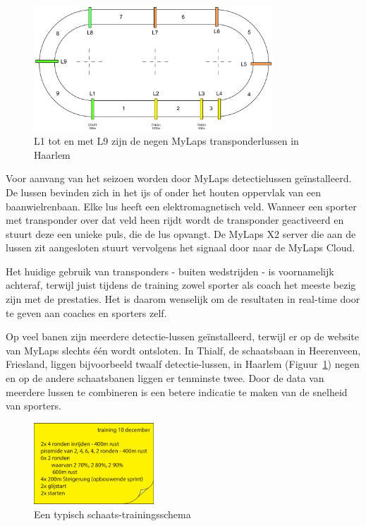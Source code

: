 \begin{figure}
  \begin{center}
    \includegraphics[width=0.8\textwidth]{style/images/BaanoverzichtHaarlem}
  \end{center}
  \caption{L1 tot en met L9 zijn de negen MyLaps transponderlussen in Haarlem}
  \label{fig:track-transponders}
\end{figure}

Voor aanvang van het seizoen worden door MyLaps detectielussen geïnstalleerd. De lussen bevinden zich in het ijs of onder het houten oppervlak van een baanwielrenbaan. Elke lus heeft een elektromagnetisch veld. Wanneer een sporter met transponder over dat veld heen rijdt wordt de transponder geactiveerd en stuurt deze een unieke puls, die de lus opvangt. De MyLaps X2 server die aan de lussen zit aangesloten stuurt vervolgens het signaal door naar de MyLaps Cloud.

Het huidige gebruik van transponders - buiten wedstrijden - is voornamelijk achteraf, terwijl juist tijdens de training zowel sporter als coach het meeste bezig zijn met de prestaties. Het is daarom wenselijk om de resultaten in real-time door te geven aan coaches en sporters zelf.

Op veel banen zijn meerdere detectie-lussen geïnstalleerd, terwijl er op de website van MyLaps slechts één wordt ontsloten. In Thialf, de schaatsbaan in Heerenveen, Friesland, liggen bijvoorbeeld twaalf detectie-lussen, in Haarlem (Figuur~\ref{fig:track-transponders}) negen en op de andere schaatsbanen liggen er tenminste twee. Door de data van meerdere lussen te combineren is een betere indicatie te maken van de snelheid van sporters.

\begin{figure}
 \includegraphics[width=0.4\textwidth]{style/images/training}
 \caption{Een typisch schaats-trainingsschema}
\end{figure}

